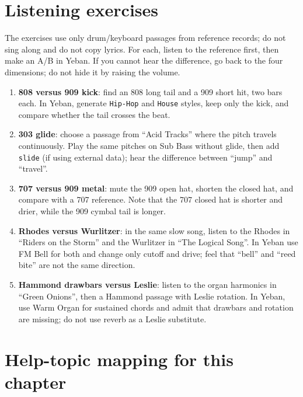 \section{Listening exercises}
\label{sec:iconic-exercises}


\begin{exercise}
The exercises use only drum/keyboard passages from reference records; do not
sing along and do not copy lyrics. For each, listen to the reference first,
then make an A/B in Yeban. If you cannot hear the difference, go back to the
four dimensions; do not hide it by raising the volume.

\begin{enumerate}
  \item \textbf{808 versus 909 kick}: find an 808 long tail and a 909 short
        hit, two bars each. In Yeban, generate \texttt{Hip-Hop} and
        \texttt{House} styles, keep only the kick, and compare whether the
        tail crosses the beat.
  \item \textbf{303 glide}: choose a passage from ``Acid Tracks'' where the
        pitch travels continuously. Play the same pitches on Sub Bass without
        glide, then add \texttt{slide} (if using external data); hear the
        difference between ``jump'' and ``travel''.
  \item \textbf{707 versus 909 metal}: mute the 909 open hat, shorten the
        closed hat, and compare with a 707 reference. Note that the 707 closed
        hat is shorter and drier, while the 909 cymbal tail is longer.
  \item \textbf{Rhodes versus Wurlitzer}: in the same slow song, listen to the
        Rhodes in ``Riders on the Storm'' and the Wurlitzer in ``The Logical
        Song''. In Yeban use FM Bell for both and change only cutoff and
        drive; feel that ``bell'' and ``reed bite'' are not the same direction.
  \item \textbf{Hammond drawbars versus Leslie}: listen to the organ
        harmonics in ``Green Onions'', then a Hammond passage with Leslie
        rotation. In Yeban, use Warm Organ for sustained chords and admit that
        drawbars and rotation are missing; do not use reverb as a Leslie
        substitute.
\end{enumerate}
\end{exercise}

\section{Help-topic mapping for this chapter}
\label{sec:iconic-help-map}

